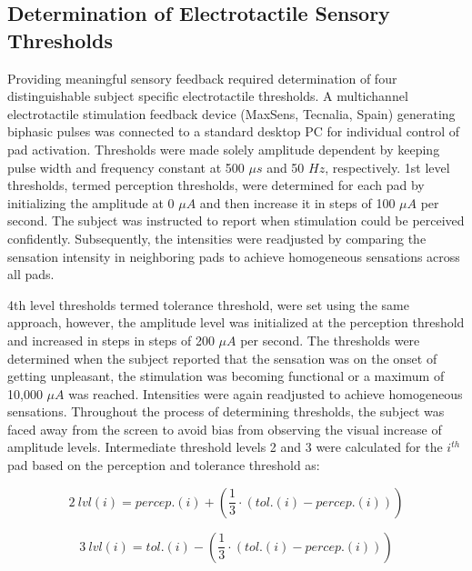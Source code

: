 
\subsection{Determination of Electrotactile Sensory Thresholds}


Providing meaningful sensory feedback required determination of four distinguishable subject specific electrotactile thresholds. A multichannel electrotactile stimulation feedback device (MaxSens, Tecnalia, Spain) generating biphasic pulses was connected to a standard desktop PC for individual control of pad activation. Thresholds were made solely amplitude dependent by keeping pulse width and frequency constant at 500 $\mu s$ and 50 $Hz$, respectively.  1st level thresholds, termed perception thresholds, were determined for each pad by initializing the amplitude at 0 $\mu A$ and then increase it in steps of 100 $\mu A$ per second. The subject was instructed to report when stimulation could be perceived confidently. Subsequently, the intensities were readjusted by comparing the sensation intensity in neighboring pads to achieve homogeneous sensations across all pads. 

4th level thresholds termed tolerance threshold, were set using the same approach, however, the amplitude level was initialized at the perception threshold and increased in steps in steps of 200 $\mu A$ per second. The thresholds were determined when the subject reported that the sensation was on the onset of getting unpleasant, the stimulation was becoming functional or a maximum of 10,000 $\mu A$ was reached. Intensities were again readjusted to achieve homogeneous sensations. Throughout the process of determining thresholds, the subject was faced away from the screen to avoid bias from observing the visual increase of amplitude levels. Intermediate threshold levels 2 and 3 were calculated for the $i^{th}$ pad based on the perception and tolerance threshold as: 


	\begin{equation}
	2~lvl(i) = percep.(i) + (\frac{1}{3} \cdot (tol.(i) - percep.(i)))
	\end{equation}

	\begin{equation}
	3~lvl(i) = tol.(i) - (\frac{1}{3} \cdot (tol.(i) - percep.(i)))
	\end{equation}
